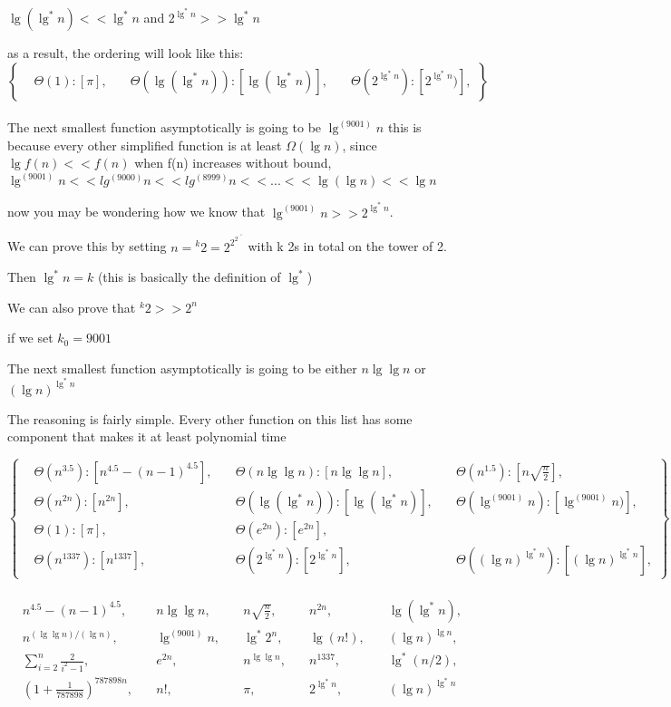 \documentclass[11pt,fleqn]{article}
\theoremstyle{definition}
\theoremstyle{remark}
\begin{document}
$\lg(\lg^*n) << \lg^*n$ and $2^{\lg^*n} >> \lg^*n$

as a result, the ordering will look like this:\\

\[
\left\{
\begin{aligned}
& \Theta(1): [\pi],
& \quad \Theta(\lg(\lg^*n)): [\lg(\lg^*n)],
& \quad \Theta(2^{\lg^*n}): [2^{\lg^*n})],
\end{aligned}
\right\}
\]\\

The next smallest function asymptotically is going to be $\lg^{(9001)} n$
this is because every other simplified function is at least $\Omega(\lg n)$,
since $\lg{f(n)} << f(n)$ when f(n) increases without bound, 
$\lg^{(9001)} n << lg^{(9000)} n << lg^{(8999)} n << ... << \lg (\lg n) << \lg n$ 

now you may be wondering how we know that $\lg^{(9001)} n >> 2^{\lg^*n}$.

We can prove this by setting $n = {}^k 2 = 2^{2^{2^{\cdot^{\cdot^{\cdot 2}}}}}$ with k
2s in total on the tower of 2.

Then $\lg^*n = k$ (this is basically the definition of $\lg^*$)

We can also prove that ${}^k 2 >> 2^n$



if we set $k_0 = 9001$

The next smallest function asymptotically is going to be either
$n \lg \lg n$ or ${(\lg n)}^{\lg^*{n}}$

The reasoning is fairly simple. Every other function on this list 
has some component that makes it at least polynomial time

\[
\left\{
\begin{aligned}
& \Theta(n^{3.5}): [n^{4.5} - (n - 1)^{4.5}], 
& \quad \Theta(n \lg \lg n): [n \lg \lg n],
& \quad \Theta(n^{1.5}): [n\sqrt{\frac{n}{2}}],\\
& \Theta(n^{2n}): [n^{2n}],
& \quad \Theta(\lg(\lg^*n)): [\lg(\lg^*n)],
& \quad \Theta(\lg^{(9001)} n): [\lg^{(9001)} n)],\\
& \Theta(1): [\pi],
& \quad \Theta(e^{2n}): [e^{2n}],\\
& \Theta(n^{1337}): [n^{1337}],
& \quad \Theta(2^{\lg^*{n}}): [2^{\lg^*{n}}],
& \quad \Theta({(\lg n)}^{\lg^*{n}}): [{(\lg n)}^{\lg^*{n}}],
\end{aligned}
\right\}
\]\\


\[
\begin{aligned}
& n^{4.5} - (n - 1)^{4.5}, & \quad n \lg \lg n, & \quad n\sqrt{\frac{n}{2}}, & \quad n^{2n}, & \quad \lg(\lg^*n), \\
& n^{({\lg \lg n})/({\lg n})}, & \quad \lg^{(9001)} n, & \quad \lg^*2^{n}, & \quad \lg(n!), & \quad (\lg n)^{\lg n}, \\
& \sum_{i=2}^n \frac{2}{{i}^2-1}, & \quad e^{2n}, & \quad n^{\lg \lg n}, & \quad n^{1337}, & \quad \lg^*{(n/2)}, \\
& (1 + \frac{1}{787898})^{787898n}, & \quad n!, & \quad \pi, & \quad 2^{\lg^*n}, & \quad (\lg n)^{\lg^* n}
\end{aligned}
\]\\
\end{document}
